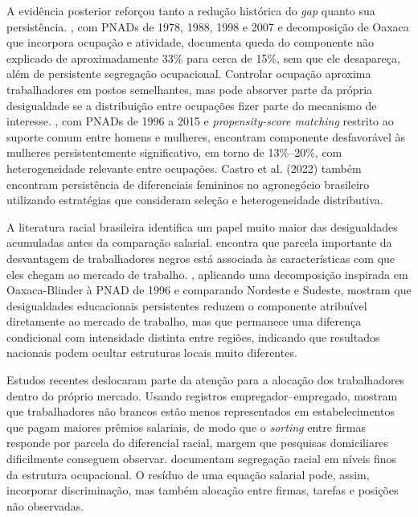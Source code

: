 \documentclass[12pt,a4paper]{article}
\begin{document}
A evidência posterior reforçou tanto a redução histórica do \textit{gap} quanto sua
persistência. \citet{madalozzo2010}, com PNADs de 1978, 1988, 1998 e 2007 e decomposição
de Oaxaca que incorpora ocupação e atividade, documenta queda do componente não explicado
de aproximadamente 33\% para cerca de 15\%, sem que ele desapareça, além de persistente
segregação ocupacional. Controlar ocupação aproxima trabalhadores em postos semelhantes,
mas pode absorver parte da própria desigualdade se a distribuição entre ocupações fizer
parte do mecanismo de interesse. \citet{morello2021}, com PNADs de 1996 a 2015 e
\textit{propensity-score matching} restrito ao suporte comum entre homens e mulheres,
encontram componente desfavorável às mulheres persistentemente significativo, em torno de
13\%–20\%, com heterogeneidade relevante entre ocupações. Castro et al. (2022) também
encontram persistência de diferenciais femininos no agronegócio brasileiro utilizando
estratégias que consideram seleção e heterogeneidade distributiva.

A literatura racial brasileira identifica um papel muito maior das desigualdades
acumuladas antes da comparação salarial. \citet{soares2000} encontra que parcela
importante da desvantagem de trabalhadores negros está associada às características com
que eles chegam ao mercado de trabalho. \citet{campante2004}, aplicando uma decomposição
inspirada em Oaxaca-Blinder à PNAD de 1996 e comparando Nordeste e Sudeste, mostram que
desigualdades educacionais persistentes reduzem o componente atribuível diretamente ao
mercado de trabalho, mas que permanece uma diferença condicional com intensidade distinta
entre regiões, indicando que resultados nacionais podem ocultar estruturas locais muito
diferentes.

Estudos recentes deslocaram parte da atenção para a alocação dos trabalhadores dentro do
próprio mercado. Usando registros empregador–empregado, \citet{gerard2021} mostram que
trabalhadores não brancos estão menos representados em estabelecimentos que pagam maiores
prêmios salariais, de modo que o \textit{sorting} entre firmas responde por parcela do
diferencial racial, margem que pesquisas domiciliares dificilmente conseguem observar.
\citet{cardoso2025} documentam segregação racial em níveis finos da estrutura ocupacional.
O resíduo de uma equação salarial pode, assim, incorporar discriminação, mas também
alocação entre firmas, tarefas e posições não observadas.
\end{document}
